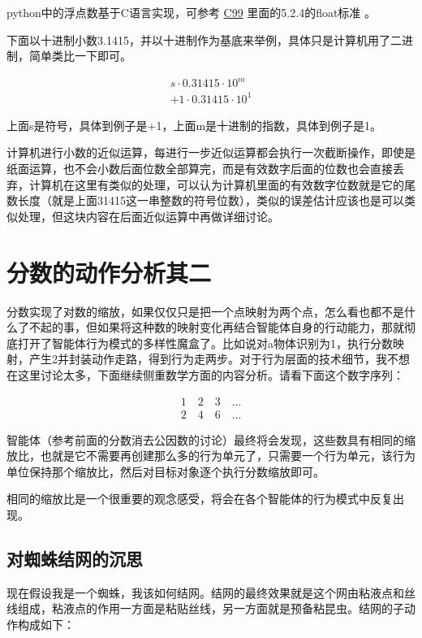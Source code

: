 \documentclass[12pt,oneside]{book}
\begin{document}
python中的浮点数基于C语言实现，可参考 \href{https://www.open-std.org/jtc1/sc22/wg14/www/docs/n1256.pdf}{C99} 里面的5.2.4的float标准 。

下面以十进制小数3.1415，并以十进制作为基底来举例，具体只是计算机用了二进制，简单类比一下即可。

\begin{align*}
s \cdot 0.31415 \cdot 10^m\\
+1 \cdot 0.31415 \cdot 10^1
\end{align*}

上面s是符号，具体到例子是+1，上面m是十进制的指数，具体到例子是1。

计算机进行小数的近似运算，每进行一步近似运算都会执行一次截断操作，即使是纸面运算，也不会小数后面位数全部算完，而是有效数字后面的位数也会直接丢弃，计算机在这里有类似的处理，可以认为计算机里面的有效数字位数就是它的尾数长度（就是上面31415这一串整数的符号位数），类似的误差估计应该也是可以类似处理，但这块内容在后面近似运算中再做详细讨论。


\section{分数的动作分析其二}
分数实现了对数的缩放，如果仅仅只是把一个点映射为两个点，怎么看也都不是什么了不起的事，但如果将这种数的映射变化再结合智能体自身的行动能力，那就彻底打开了智能体行为模式的多样性魔盒了。比如说对a物体识别为1，执行分数映射，产生2并封装动作走路，得到行为走两步。对于行为层面的技术细节，我不想在这里讨论太多，下面继续侧重数学方面的内容分析。请看下面这个数字序列：

\begin{align*}
1 \quad 2  \quad 3 \quad ... \\
2 \quad 4  \quad 6 \quad ...
\end{align*}


智能体（参考前面的分数消去公因数的讨论）最终将会发现，这些数具有相同的缩放比，也就是它不需要再创建那么多的行为单元了，只需要一个行为单元，该行为单位保持那个缩放比，然后对目标对象逐个执行分数缩放即可。

相同的缩放比是一个很重要的观念感受，将会在各个智能体的行为模式中反复出现。


\subsection{对蜘蛛结网的沉思}
现在假设我是一个蜘蛛，我该如何结网。结网的最终效果就是这个网由粘液点和丝线组成，粘液点的作用一方面是粘贴丝线，另一方面就是预备粘昆虫。结网的子动作构成如下：
\end{document}
